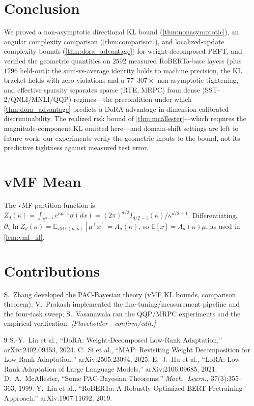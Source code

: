 \documentclass[10pt]{article}
\newcommand{\vMF}{\mathrm{vMF}}
\newcommand{\Ad}{A_d}
\newcommand{\Sd}{\mathbb{S}^{d-1}}
\newcommand{\E}{\mathbb{E}}
\begin{document}
\section{Conclusion}
We proved a non-asymptotic directional KL bound (\cref{thm:nonasymptotic}), an angular
complexity comparison (\cref{thm:comparison}), and localized-update complexity bounds
(\cref{thm:dora_advantage}) for weight-decomposed PEFT, and verified the geometric
quantities on $2592$ measured RoBERTa-base layers (plus $1296$ held-out): the
sum-vs-average identity holds to machine precision, the KL bracket holds with zero
violations and a $77$--$307\times$ non-asymptotic tightening, and effective sparsity
separates sparse (RTE, MRPC) from dense (SST-2/QNLI/MNLI/QQP) regimes---the precondition
under which \cref{thm:dora_advantage} predicts a DoRA advantage in dimension-calibrated
discriminability. The realized risk bound of \cref{thm:mcallester}---which requires the
magnitude-component KL omitted here---and domain-shift settings are left to future work;
our experiments verify the geometric inputs to the bound, not its predictive tightness
against measured test error.

\appendix
\section{vMF Mean}\label{app:mean}
The vMF partition function is $Z_d(\kappa)=\int_{\Sd}e^{\kappa\mu^\top x}\sigma(dx)
=(2\pi)^{d/2}I_{d/2-1}(\kappa)/\kappa^{d/2-1}$. Differentiating,
$\partial_\kappa\ln Z_d(\kappa)=\E_{\vMF(\mu,\kappa)}[\mu^\top x]=\Ad(\kappa)$,
so $\E[x]=\Ad(\kappa)\mu$, as used in \cref{lem:vmf_kl}.

\section*{Contributions}
\small
S.~Zhang developed the PAC-Bayesian theory (vMF KL bounds, comparison theorem); V.~Prakash
implemented the fine-tuning/measurement pipeline and the four-task sweep; S.~Vasanawala ran
the QQP/MRPC experiments and the empirical verification. \emph{[Placeholder---confirm/edit.]}

\begin{thebibliography}{9}
\small
{} S.-Y.\ Liu et al., ``DoRA: Weight-Decomposed Low-Rank
Adaptation,'' arXiv:2402.09353, 2024.
 C.\ Si et al., ``MAP: Revisiting Weight Decomposition for Low-Rank
Adaptation,'' arXiv:2505.23094, 2025.
 E.\ J.\ Hu et al., ``LoRA: Low-Rank Adaptation of Large Language
Models,'' arXiv:2106.09685, 2021.
 D.\ A.\ McAllester, ``Some PAC-Bayesian Theorems,''
\textit{Mach.\ Learn.}, 37(3):355--363, 1999.
 Y.\ Liu et al., ``RoBERTa: A Robustly Optimized BERT
Pretraining Approach,'' arXiv:1907.11692, 2019.
\end{thebibliography}
\end{document}
